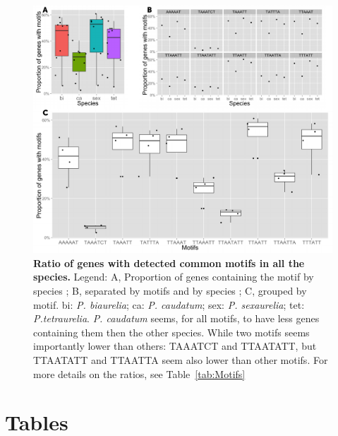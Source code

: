 \documentclass[10pt]{article}
\begin{document}
\begin{figure}[!ht]
\begin{center}
\includegraphics[scale=0.5]{Figures/PropFigure.pdf}
\end{center}
\caption{
{\bf Ratio of genes with detected common motifs in all the species.} Legend: A, Proportion of genes containing the motif by species ; B, separated by motifs and by species ; C, grouped by motif. bi: \textit{P. biaurelia}; ca: \textit{P. caudatum}; sex: \textit{P. sexaurelia}; tet: \textit{P.tetraurelia}. \textit{P. caudatum} seems, for all motifs, to have less genes containing them then the other species. While two motifs seems importantly lower than others: TAAATCT and TTAATATT, but TTAATATT and TTAATTA seem also lower than other motifs. For more details on the ratios, see Table~\ref{tab:Motifs}
}
\label{fig:PropFigure}
\end{figure}

\section*{Tables}


\clearpage

\end{document}
